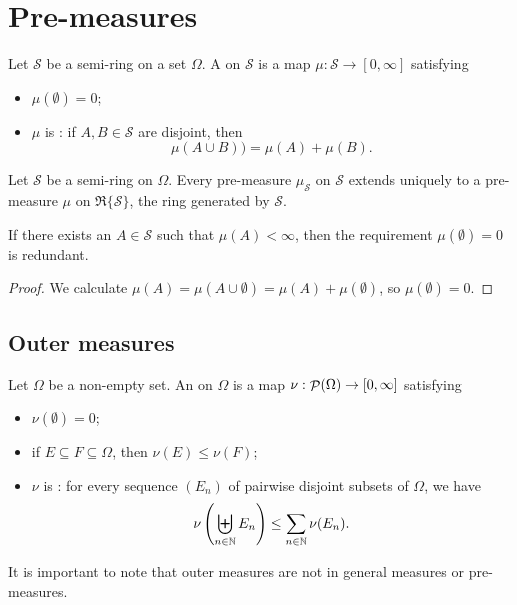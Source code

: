 \section{Pre-measures}
\begin{definition}
Let $\mathcal{S}$ be a semi-ring on a set $\Omega$. A  on $\mathcal{S}$ is a map $\mu: \mathcal{S} \to [0,\infty]$ satisfying
\begin{itemize}
\item $\mu(\emptyset) = 0$;
\item $\mu$ is : if $A,B \in \mathcal{S}$ are disjoint, then
\[ \mu(A\cup B)) = \mu(A)+\mu(B). \]
\end{itemize}
\end{definition}
\begin{proposition}
Let $\mathcal{S}$ be a semi-ring on $\Omega$. Every pre-measure $\mu_\mathcal{S}$ on $\mathcal{S}$ extends uniquely to a pre-measure $\mu$ on $\mathfrak{R}\{\mathcal{S}\}$, the ring generated by $\mathcal{S}$.
\end{proposition}

\begin{lemma} \label{emptysetNullset}
If there exists an $A\in \mathcal{S}$ such that $\mu(A) < \infty$, then the requirement $\mu(\emptyset) = 0$ is redundant.
\end{lemma}
\begin{proof}
We calculate $\mu(A) = \mu(A \cup \emptyset) = \mu(A) + \mu(\emptyset)$, so $\mu(\emptyset) = 0$.
\end{proof}


\subsection{Outer measures}
\begin{definition}
Let $\Omega$ be a non-empty set. An  on $\Omega$ is a map $\nu: \mathop{\mathcal{P}}(\Omega)\to [0,\infty]$ satisfying
\begin{itemize}
\item $\nu(\emptyset) = 0$;
\item if $E\subseteq F\subseteq \Omega$, then $\nu(E)\leq \nu(F)$;
\item $\nu$ is : for every sequence $(E_n)$ of pairwise disjoint subsets of $\Omega$, we have
\[ \nu\left(\biguplus_{n\in\mathbb{N}}E_n\right) \leq \sum_{n\in\mathbb{N}}\nu(E_n). \]
\end{itemize}
\end{definition}
It is important to note that outer measures are not in general measures or pre-measures.

